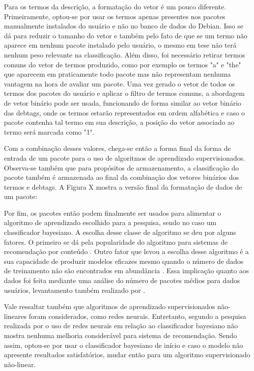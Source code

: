 Para os termos da descrição, a formatação do vetor é um pouco diferente. Primeiramente, optou-se por usar os termos apenas presentes
nos pacotes manualmente instalados do usuário e não no banco de dados do Debian. Isso se dá para reduzir o tamanho do vetor e também
pelo fato de que se um termo não aparece em nenhum pacote instalado pelo usuário, o mesmo em tese não terá nenhum peso relevante na
classificação. Além disso, foi necessário retirar termos comuns do vetor de termos produzido, como por exemplo os termos "a" e "the" que
aparecem em praticamente todo pacote mas não representam nenhuma vantagem na hora de avaliar um pacote. Uma vez gerado o vetor de todos os
termos dos pacotes do usuário e aplicar o filtro de termos comuns, a abordagem de vetor binário pode ser usada, funcionando de forma
similar ao vetor binário das debtags, onde os termos estarão representados em ordem alfabética e caso o pacote contenha tal termo em sua
descrição, a posição do vetor associado ao termo será marcada como "1".

Com a combinação desses valores, chega-se então a forma final da forma de entrada de um pacote para o uso de algoritmos de aprendizado 
supervisionados. Observa-se também que para propósitos de  armazenamento, a classificação do pacote também é armazenada ao final da combinação
dos vetores binários dos termos e debtags. A Figura X mostra a versão final da formatação de dados de um pacote:

Por fim, os pacotes então podem finalmente ser usados para alimentar o algoritmo de aprendizado escolhido para a pesquisa, sendo no caso um
classificador bayesiano. A escolha desse classe de algoritmo se deu por alguns fatores. O primeiro se dá pela popularidade do algoritmo para
sistemas de recomendação por conteúdo \cite{amatriain2011data}. Outro fator que levou a escolha desse algoritmo é a sua capacidade de produzir
modelos eficazes mesmo quando o número de dados de treinamento não são encontrados em abundância \cite{segaran2007programming}. Essa implicação
quanto aos dados foi feita mediante uma análise do número de pacotes médios para dados usuários, levantamento também realizado por \cite{araujo2011apprecommender}.

Vale ressaltar também que algoritmos de aprendizado supervisionados não-lineares foram considerados, como redes neurais. Entretanto, segundo
a pesquisa realizada por \cite{pazzani1997learning} o uso de redes neurais em relação ao classificador bayesiano não mostra nenhuma melhoria
considerável para sistema de recomendação. Sendo assim, optou-se por usar o classificador bayesiano de início e caso o modelo não apresente
resultados satisfatórios, mudar então para um algoritmo supervisionado não-linear.

